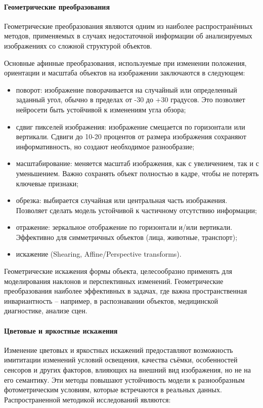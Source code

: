 \paragraph{Геометрические преобразования}

Геометрические преобразования являются одним из наиболее распространённых методов, применяемых в случаях недостаточной информации об анализируемых изображениях со сложной структурой объектов.

Основные афинные преобразования, используемые при изменении положения, ориентации и масштаба объектов на изображении заключаются в следующем:

\begin{itemize}
	\item поворот: изображение поворачивается на случайный или определенный заданный угол, обычно в пределах от -30 до +30 градусов. Это позволяет нейросети быть устойчивой к изменениям угла обзора;
	\item сдвиг пикселей изображения: изображение смещается по горизонтали или вертикали. Сдвиги до 10-20 процентов от размера изображения сохраняют информативность, но создают необходимое разнообразие;
	\item масштабирование: меняется масштаб изображения, как с увеличением, так и с уменьшением. Важно сохранять объект полностью в кадре, чтобы не потерять ключевые признаки;
	\item обрезка: выбирается случайная или центральная часть изображения. Позволяет сделать модель устойчивой к частичному отсутствию информации;
	\item отражение: зеркальное отображение по горизонтали и/или вертикали. Эффективно для симметричных объектов (лица, животные, транспорт);
	\item искажение (Shearing, Affine/Perspective transforms).
\end{itemize}

Геометрические искажения формы объекта, целесообразно применять для моделирования наклонов и перспективных изменений. Геометрические преобразования наиболее эффективных в задачах, где важна пространственная инвариантность – например, в распознавании объектов, медицинской диагностике, анализе сцен.

\paragraph{Цветовые и яркостные искажения}

Изменение цветовых и яркостных искажений предоставляют возможность имититации изменений условий освещения, качества съёмки, особенностей сенсоров и других факторов, влияющих на внешний вид изображения, но не на его семантику. Эти методы повышают устойчивость модели к разнообразным фотометрическим условиям, которые встречаются в реальных данных. Распространенной методикой исследований являются:

